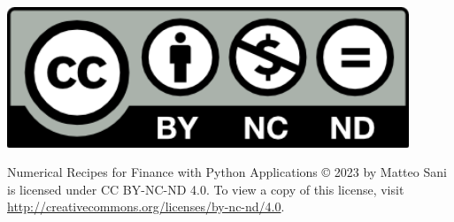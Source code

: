 \thispagestyle{empty}
\cleardoublepage\null
\vspace*{\fill}
\begin{minipage}{0.25\textwidth}
\includegraphics[width=0.9\textwidth]{figures/by-nc-nd}
\end{minipage}
\begin{minipage}{0.75\textwidth}
Numerical Recipes for Finance with Python Applications © 2023 by Matteo Sani is licensed under CC BY-NC-ND 4.0. To view a copy of this license, visit \href{http://creativecommons.org/licenses/by-nc-nd/4.0}{http://creativecommons.org/licenses/by-nc-nd/4.0}.
\end{minipage}

\thispagestyle{empty}
